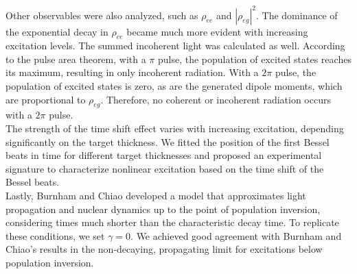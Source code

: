 Other observables were also analyzed, such as $\rho_{ee}$ and $|\rho_{eg}|^2$. The dominance of the exponential decay in $\rho_{ee}$ became much more evident with increasing excitation levels. The summed incoherent light was calculated as well. According to the pulse area theorem, with a $\pi$ pulse, the population of excited states reaches its maximum, resulting in only incoherent radiation. With a $2\pi $ pulse, the population of excited states is zero, as are the generated dipole moments, which are proportional to $\rho_{eg}$. Therefore, no coherent or incoherent radiation occurs with a $2\pi $ pulse.\\

The strength of the time shift effect varies with increasing excitation, depending significantly on the target thickness. We fitted the position of the first Bessel beats in time for different target thicknesses and proposed an experimental signature to characterize nonlinear excitation based on the time shift of the Bessel beats.\\

Lastly, Burnham and Chiao \cite{BURNHAM1969} developed a model that approximates light propagation and nuclear dynamics up to the point of population inversion, considering times much shorter than the characteristic decay time. To replicate these conditions, we set $\gamma = 0$. We achieved good agreement with Burnham and Chiao's results in the non-decaying, propagating limit for excitations below population inversion.

\fi